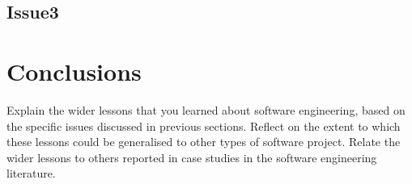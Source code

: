 \documentclass{l3proj}
\begin{document}
\subsection{Issue3}


\section{Conclusions}
Explain the wider lessons that you learned about software engineering,
based on the specific issues discussed in previous sections.  Reflect
on the extent to which these lessons could be generalised to other
types of software project.  Relate the wider lessons to others
reported in case studies in the software engineering literature.



\end{document}
